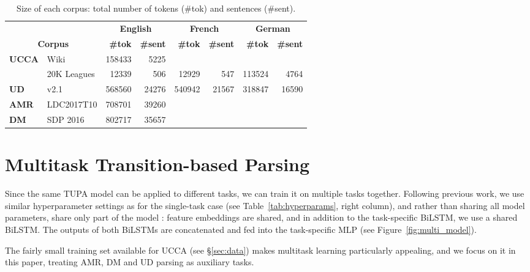\documentclass[11pt,a4paper]{article}
\begin{document}
\begin{table*}[ht]
\centering
\begin{tabular}{ll|rr|rr|rr}
& & \multicolumn{2}{c|}{\footnotesize \bf English} & \multicolumn{2}{c|}{\footnotesize \bf French} & \multicolumn{2}{c}{\footnotesize \bf German} \\
\multicolumn{2}{c|}{\footnotesize \bf Corpus} & \footnotesize \bf {\#}tok & \footnotesize \bf {\#}sent & \footnotesize \bf {\#}tok & \footnotesize \bf {\#}sent & \footnotesize \bf {\#}tok & \footnotesize \bf {\#}sent \\
\hline
\textbf{UCCA}
& Wiki & 158433 & 5225 &&&& \\
& 20K Leagues & 12339 & 506 & 12929 & 547 & 113524 & 4764 \\
\hline
\textbf{UD} & v2.1 & 568560 & 24276 & 540942 & 21567 & 318847 & 16590 \\
\hline
\textbf{AMR} & LDC2017T10 & 708701 & 39260 \\
\hline
\textbf{DM} & SDP 2016 & 802717 & 35657 \\
\end{tabular}
\caption{Size of each corpus: total number of tokens ({\#}tok) and sentences
({\#}sent).\label{tab:corpora}}
\end{table*}


\section{Multitask Transition-based Parsing}\label{sec:multitask}

Since the same TUPA model can be applied to different tasks, 
we can train it on multiple tasks together.
Following previous work, we use similar hyperparameter settings as for the single-task 
case (see Table~\ref{tab:hyperparams}, right column),
and rather than sharing all model parameters, share only part of the model
\cite{N16-1179,P16-2038,C16-1013,C16-1059,C16-1179,E17-1005,P17-1186}:
feature embeddings are shared, and in addition to the task-specific BiLSTM,
we use a shared BiLSTM. The outputs of both BiLSTMs are concatenated and
fed into the task-specific MLP (see Figure~\ref{fig:multi_model}).

The fairly small training set available for UCCA (see \S\ref{sec:data})
makes multitask learning particularly appealing,
and we focus on it in this paper, treating AMR, DM and UD parsing as auxiliary tasks.
\end{document}
